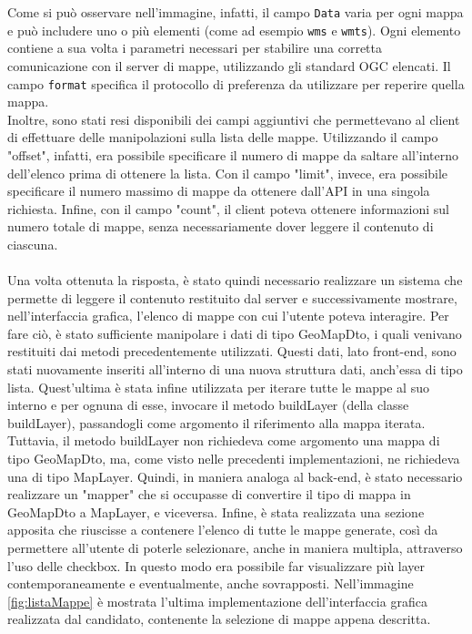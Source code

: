 Come si può osservare nell'immagine, infatti, il campo \verb|Data| varia per ogni mappa e può includere uno o più elementi (come ad esempio \verb|wms| e \verb|wmts|). Ogni elemento contiene a sua volta i parametri necessari per stabilire una corretta comunicazione con il server di mappe, utilizzando gli standard OGC elencati. Il campo \verb|format| specifica il protocollo di preferenza da utilizzare per reperire quella mappa.
\\Inoltre, sono stati resi disponibili dei campi aggiuntivi che permettevano al client di effettuare delle manipolazioni sulla lista delle mappe. Utilizzando il campo "offset", infatti, era possibile specificare il numero di mappe da saltare all'interno dell'elenco prima di ottenere la lista. Con il campo "limit", invece, era possibile specificare il numero massimo di mappe da ottenere dall'API in una singola richiesta. Infine, con il campo "count", il client poteva ottenere informazioni sul numero totale di mappe, senza necessariamente dover leggere il contenuto di ciascuna.
\\~\\
Una volta ottenuta la risposta, è stato quindi necessario realizzare un sistema che permette di leggere il contenuto restituito dal server e successivamente mostrare, nell'interfaccia grafica, l'elenco di mappe con cui l'utente poteva interagire. Per fare ciò, è stato sufficiente manipolare i dati di tipo GeoMapDto, i quali venivano restituiti dai metodi precedentemente utilizzati. Questi dati, lato front-end, sono stati nuovamente inseriti all'interno di una nuova struttura dati, anch'essa di tipo lista. Quest'ultima è stata infine utilizzata per iterare tutte le mappe al suo interno e per ognuna di esse, invocare il metodo buildLayer (della classe buildLayer), passandogli come argomento il riferimento alla mappa iterata. Tuttavia, il metodo buildLayer non richiedeva come argomento una mappa di tipo GeoMapDto, ma, come visto nelle precedenti implementazioni, ne richiedeva una di tipo MapLayer. Quindi, in maniera analoga al back-end, è stato necessario realizzare un "mapper" che si occupasse di convertire il tipo di mappa in GeoMapDto a MapLayer, e viceversa.
Infine, è stata realizzata una sezione apposita che riuscisse a contenere l'elenco di tutte le mappe generate, così da permettere all'utente di poterle selezionare, anche in maniera multipla, attraverso l'uso delle checkbox. In questo modo era possibile far visualizzare più layer contemporaneamente e eventualmente, anche sovrapposti. Nell'immagine \ref{fig:listaMappe} è mostrata l'ultima implementazione dell'interfaccia grafica realizzata dal candidato, contenente la selezione di mappe appena descritta.
